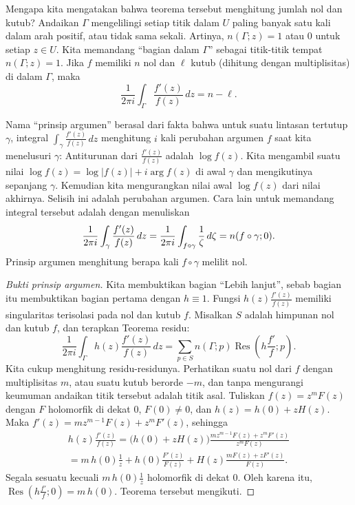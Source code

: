 \documentclass[12pt,openany]{book}
\newcommand{\avoidbreak}{\postdisplaypenalty=100}
\newcommand{\sabs}[1]{\lvert {#1} \rvert}
\newcommand{\myquote}[1]{``#1''}
\theoremstyle{plain}
\theoremstyle{remark}
\theoremstyle{definition}
\theoremstyle{exercise}
\theoremstyle{example}
\begin{document}
Mengapa kita mengatakan bahwa teorema tersebut menghitung jumlah nol dan kutub?
Andaikan $\Gamma$ mengelilingi setiap titik dalam $U$ paling banyak satu kali
dalam arah positif, atau tidak sama sekali. Artinya,
$n(\Gamma;z) = 1$ atau $0$ untuk setiap $z \in U$. Kita memandang
\myquote{bagian dalam $\Gamma$} sebagai titik-titik tempat $n(\Gamma;z)=1$.
Jika $f$ memiliki $n$ nol dan $\ell$ kutub (dihitung dengan multiplisitas)
di dalam $\Gamma$, maka
\begin{equation*}
\frac{1}{2\pi i}
\int_\Gamma \frac{f'(z)}{f(z)} \, dz
= n - \ell .
\end{equation*}

Nama \myquote{prinsip argumen} berasal dari fakta bahwa untuk suatu lintasan tertutup
$\gamma$,
integral
$\int_{\gamma} \frac{f'(z)}{f(z)} \, dz$
menghitung $i$ kali perubahan argumen $f$ saat kita menelusuri $\gamma$:
Antiturunan dari
$\frac{f'(z)}{f(z)}$
adalah $\log f(z)$.
Kita mengambil suatu nilai $\log f(z) = \log \sabs{f(z)} + i \arg f(z)$
di awal $\gamma$ dan mengikutinya
sepanjang $\gamma$.
Kemudian kita mengurangkan nilai awal $\log f(z)$ dari nilai akhirnya.
Selisih ini adalah perubahan argumen.
Cara lain untuk memandang integral tersebut adalah dengan menuliskan
\begin{equation*}
\frac{1}{2\pi i}
\int_{\gamma} \frac{f'(z)}{f(z)} \, dz =
\frac{1}{2\pi i}
\int_{f \circ \gamma} \frac{1}{\zeta} \, d\zeta
=
n(f \circ \gamma ; 0 )
.
\avoidbreak
\end{equation*}
Prinsip
argumen menghitung berapa kali
$f \circ \gamma$ melilit nol.

\begin{proof}[Bukti prinsip argumen]
Kita membuktikan bagian \myquote{Lebih lanjut}, sebab bagian itu membuktikan bagian pertama
dengan $h \equiv 1$.
Fungsi $h(z) \frac{f'(z)}{f(z)}$ memiliki singularitas terisolasi
pada nol dan kutub $f$. Misalkan $S$ adalah himpunan nol dan kutub $f$,
dan terapkan Teorema residu:
\begin{equation*}
\frac{1}{2\pi i}
\int_\Gamma h(z) \frac{f'(z)}{f(z)} \, dz
=
\sum_{p \in S} n(\Gamma;p)\operatorname{Res}\left(h \frac{f'}{f};p\right) .
\end{equation*}
Kita cukup menghitung residu-residunya.
Perhatikan suatu nol dari $f$ dengan multiplisitas $m$, atau suatu kutub berorde $-m$, dan
tanpa mengurangi keumuman andaikan titik tersebut adalah titik asal.
Tuliskan $f(z)  = z^m F(z)$ dengan $F$ holomorfik di dekat $0$,
$F(0) \neq 0$,
dan $h(z) = h(0) + z H(z)$.
Maka $f'(z) = m z^{m-1} F(z) + z^m F'(z)$, sehingga
\begin{multline*}
h(z) \frac{f'(z)}{f(z)}
=
\bigl( h(0) + z H(z) \bigr)
\frac{m z^{m-1} F(z) + z^m F'(z)}{z^m F(z)}
\\
=
m\, h(0)
\frac{1}{z}
+
h(0)
\frac{F'(z)}{F(z)}
+
H(z)
\frac{m F(z) + z F'(z)}{F(z)} .
\end{multline*}
Segala sesuatu kecuali $m\, h(0) \frac{1}{z}$ holomorfik di dekat $0$.
Oleh karena itu, $\operatorname{Res}\left(h\frac{f'}{f};0\right) = m\, h(0)$.
Teorema tersebut mengikuti.
\end{proof}
\end{document}
